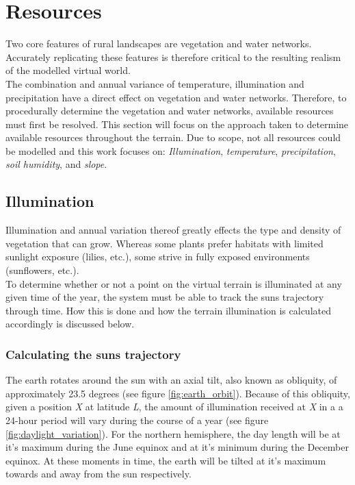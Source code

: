\section{Resources}

Two core features of rural landscapes are vegetation and water networks. Accurately replicating these features is therefore critical to the resulting realism of the modelled virtual world.\\
The combination and annual variance of temperature, illumination and precipitation have a direct effect on vegetation and water networks. Therefore, to procedurally determine the vegetation and water networks, available resources must first be resolved. This section will focus on the approach taken to determine available resources throughout the terrain. Due to scope, not all resources could be modelled and this work focuses on: \textit{Illumination}, \textit{temperature}, \textit{precipitation}, \textit{soil humidity},  and \textit{slope}. 

\subsection{Illumination}

Illumination and annual variation thereof greatly effects the type and density of vegetation that can grow. Whereas some plants prefer habitats with limited sunlight exposure (lilies, etc.), some strive in fully exposed environments (sunflowers, etc.). \\
To determine whether or not a point on the virtual terrain is illuminated at any given time of the year, the system must be able to track the suns trajectory through time. How this is done and how the terrain illumination is calculated accordingly is discussed below.

\subsubsection{Calculating the suns trajectory}

The earth rotates around the sun with an axial tilt, also known as obliquity, of approximately 23.5 degrees (see figure \ref{fig:earth_orbit}). Because of this obliquity, given a position \textit{X} at latitude \textit{L}, the amount of illumination received at \textit{X} in a a 24-hour period will vary during the course of a year (see figure \ref{fig:daylight_variation}). For the northern hemisphere, the day length will be at it's maximum during the June equinox and at it's minimum during the December equinox. At these moments in time, the earth will be tilted at it's maximum towards and away from the sun respectively.\\

